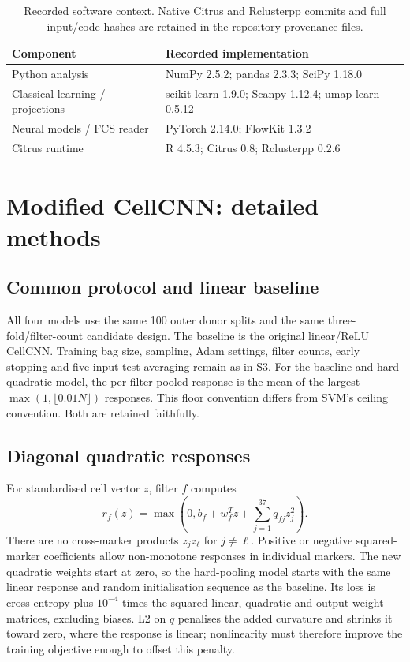 \documentclass[11pt,a4paper]{article}
\begin{document}
\begin{table}[htb]\centering\small
\begin{tabular}{@{}ll@{}}\toprule
Component & Recorded implementation\\\midrule
Python analysis & NumPy 2.5.2; pandas 2.3.3; SciPy 1.18.0\\
Classical learning / projections & scikit-learn 1.9.0; Scanpy 1.12.4; umap-learn 0.5.12\\
Neural models / FCS reader & PyTorch 2.14.0; FlowKit 1.3.2\\
Citrus runtime & R 4.5.3; Citrus 0.8; Rclusterpp 0.2.6\\\bottomrule
\end{tabular}
\caption{Recorded software context. Native Citrus and Rclusterpp commits and full input/code hashes are retained in the repository provenance files.}
\end{table}

\clearpage
\section{Modified CellCNN: detailed methods}
\subsection{Common protocol and linear baseline}
All four models use the same 100 outer donor splits and the same three-fold/filter-count candidate design. The baseline is the original linear/ReLU CellCNN. Training bag size, sampling, Adam settings, filter counts, early stopping and five-input test averaging remain as in S3. For the baseline and hard quadratic model, the per-filter pooled response is the mean of the largest $\max(1,\lfloor0.01N\rfloor)$ responses. This floor convention differs from SVM's ceiling convention. Both are retained faithfully.

\subsection{Diagonal quadratic responses}
For standardised cell vector $z$, filter $f$ computes
\[
r_f(z)=\max\left(0,b_f+w_f^Tz+\sum_{j=1}^{37}q_{fj}z_j^2\right).
\]
There are no cross-marker products $z_jz_\ell$ for $j\ne\ell$. Positive or negative squared-marker coefficients allow non-monotone responses in individual markers. The new quadratic weights start at zero, so the hard-pooling model starts with the same linear response and random initialisation sequence as the baseline. Its loss is cross-entropy plus $10^{-4}$ times the squared linear, quadratic and output weight matrices, excluding biases. L2 on $q$ penalises the added curvature and shrinks it toward zero, where the response is linear; nonlinearity must therefore improve the training objective enough to offset this penalty.
\end{document}

